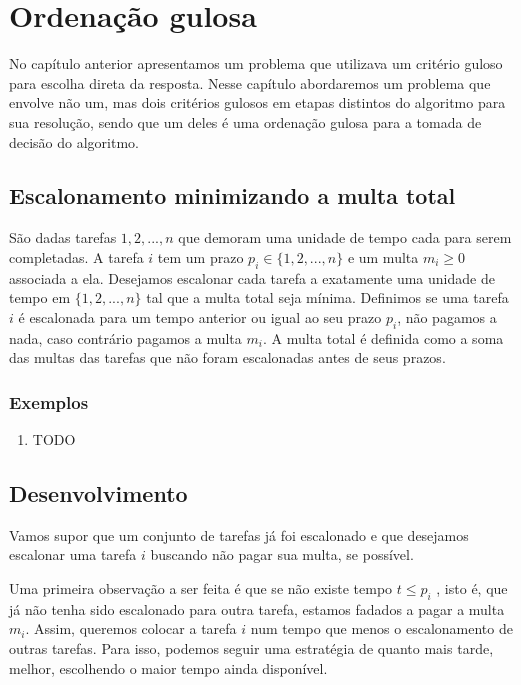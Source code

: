 \chapter{Ordenação gulosa}
\label{ordenacao}

No capítulo anterior apresentamos um problema que utilizava um critério guloso para escolha direta da resposta. Nesse capítulo abordaremos um problema que envolve não um, mas dois critérios gulosos em etapas distintos do algoritmo para sua resolução, sendo que um deles é uma ordenação gulosa para a tomada de decisão do algoritmo.

\section{Escalonamento minimizando a multa total}

São dadas tarefas $1, 2, ..., n$ que demoram uma unidade de tempo cada para serem completadas. A tarefa $i$ tem um prazo $p_i \in \{1, 2, ..., n\}$ e um multa $m_i \geq 0$ associada a ela. Desejamos escalonar cada tarefa a exatamente uma unidade de tempo em $\{1, 2, ..., n\}$ tal que a multa total seja mínima. Definimos se uma tarefa $i$ é escalonada para um tempo anterior ou igual ao seu prazo $p_i$, não pagamos a nada, caso contrário pagamos a multa $m_i$. A multa total é definida como a soma das multas das tarefas que não foram escalonadas antes de seus prazos.

\subsection*{Exemplos}

\begin{enumerate}
    \item TODO
\end{enumerate}

\section{Desenvolvimento}

Vamos supor que um conjunto de tarefas já foi escalonado e que desejamos escalonar uma tarefa $i$ buscando não pagar sua multa, se possível.

Uma primeira observação a ser feita é que se não existe tempo $t \leq p_i$ , isto é, que já não tenha sido escalonado para outra tarefa, estamos fadados a pagar a multa $m_i$. Assim, queremos colocar a tarefa $i$ num tempo que menos  o escalonamento de outras tarefas. Para isso, podemos seguir uma estratégia de quanto mais tarde, melhor, escolhendo o maior tempo ainda disponível.

